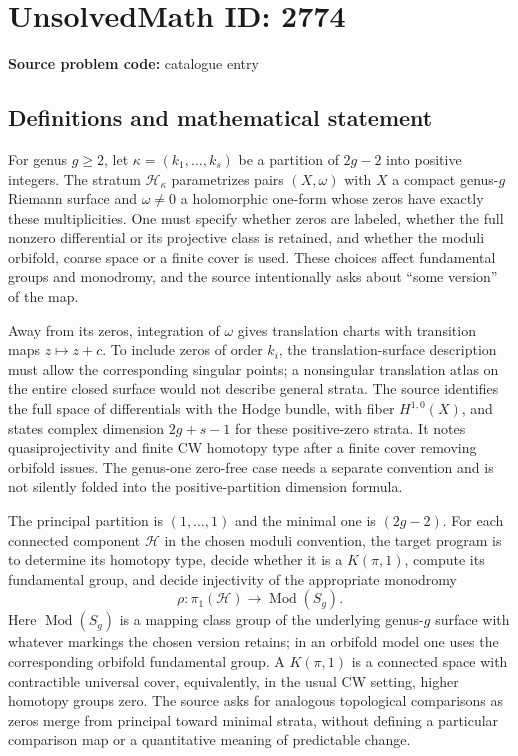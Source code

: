 \documentclass[11pt]{article}
\begin{document}
\section*{UnsolvedMath ID: 2774}
\textbf{Source problem code:} catalogue entry
\subsection{Definitions and mathematical statement}
For genus $g\geq2$, let $\kappa=(k_1,\ldots,k_s)$ be a partition of $2g-2$ into positive integers. The stratum $\mathcal H_\kappa$ parametrizes pairs $(X,\omega)$ with $X$ a compact genus-$g$ Riemann surface and $\omega\ne0$ a holomorphic one-form whose zeros have exactly these multiplicities. One must specify whether zeros are labeled, whether the full nonzero differential or its projective class is retained, and whether the moduli orbifold, coarse space or a finite cover is used. These choices affect fundamental groups and monodromy, and the source intentionally asks about ``some version'' of the map.

Away from its zeros, integration of $\omega$ gives translation charts with transition maps $z\mapsto z+c$. To include zeros of order $k_i$, the translation-surface description must allow the corresponding singular points; a nonsingular translation atlas on the entire closed surface would not describe general strata. The source identifies the full space of differentials with the Hodge bundle, with fiber $H^{1,0}(X)$, and states complex dimension $2g+s-1$ for these positive-zero strata. It notes quasiprojectivity and finite CW homotopy type after a finite cover removing orbifold issues. The genus-one zero-free case needs a separate convention and is not silently folded into the positive-partition dimension formula.

The principal partition is $(1,\ldots,1)$ and the minimal one is $(2g-2)$. For each connected component $\mathcal H$ in the chosen moduli convention, the target program is to determine its homotopy type, decide whether it is a $K(\pi,1)$, compute its fundamental group, and decide injectivity of the appropriate monodromy
\[
\rho:\pi_1(\mathcal H)\longrightarrow\operatorname{Mod}(S_g).
\]
Here $\operatorname{Mod}(S_g)$ is a mapping class group of the underlying genus-$g$ surface with whatever markings the chosen version retains; in an orbifold model one uses the corresponding orbifold fundamental group. A $K(\pi,1)$ is a connected space with contractible universal cover, equivalently, in the usual CW setting, higher homotopy groups zero. The source asks for analogous topological comparisons as zeros merge from principal toward minimal strata, without defining a particular comparison map or a quantitative meaning of predictable change.
\end{document}
